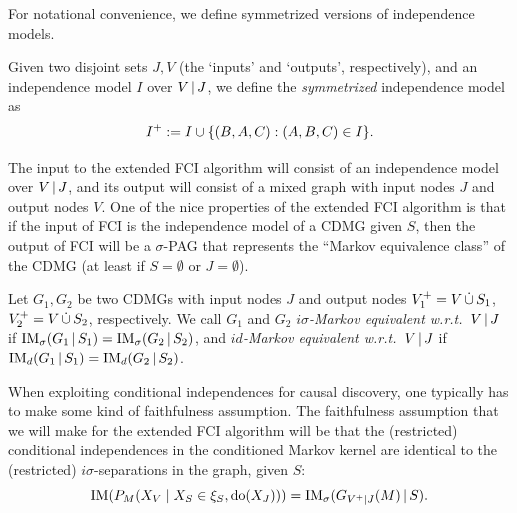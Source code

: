 

For notational convenience, we define symmetrized versions of independence models.
\begin{Def}\label{def:symmetrized_independence_model}
  Given two disjoint sets $J,V$ (the `inputs' and `outputs', respectively), 
  and an independence model $I$ over $V \operatorname*{|} J$, we define the \emph{symmetrized} independence model as
  $$I^+ := I \cup \{ \left ( B, A, C \right ) : \left ( A, B, C \right ) \in I \}. $$
\end{Def}

The input to the extended FCI algorithm will consist of an independence model over $V \operatorname*{|} J$, and its output will consist of a mixed graph with input nodes $J$ and output nodes $V$.
One of the nice properties of the extended FCI algorithm is that if the input of FCI is the independence model of a CDMG given $S$, then the output of FCI will be a $\sigma$-PAG that represents the ``Markov equivalence class'' of the CDMG (at least if $S = \emptyset$ or $J = \emptyset$).
\begin{Def}\label{def:Markov_equivalent}
  Let $G_1, G_2$ be two CDMGs with input nodes $J$ and output nodes $V_1^+ = V \,\dot{\cup}\, S_1$, $V_2^+ = V \,\dot{\cup}\, S_2$, respectively.
  We call $G_1$ and $G_2$ \emph{$i\sigma$-Markov equivalent w.r.t.\ $V \operatorname*{|} J$} if $\mathrm{IM}_\sigma(G_1 \operatorname*{|} S_1) = \mathrm{IM}_\sigma(G_2 \operatorname*{|} S_2)$, and \emph{$id$-Markov equivalent w.r.t.\ $V \operatorname*{|} J$} if $\mathrm{IM}_d(G_1 \operatorname*{|} S_1) = \mathrm{IM}_d(G_2 \operatorname*{|} S_2)$.
\end{Def}

When exploiting conditional independences for causal discovery, one typically has to make some kind of faithfulness assumption.
The faithfulness assumption that we will make for the extended FCI algorithm will be that the (restricted) conditional independences in the conditioned Markov kernel are identical to the (restricted) $i\sigma$-separations in the graph, given $S$:
$$\mathrm{IM}(P_{M}(X_V \mid X_S \in \xi_S, \operatorname{do}(X_J))) = \mathrm{IM}_\sigma(G_{V^+|J}(M) \operatorname*{|} S).$$

